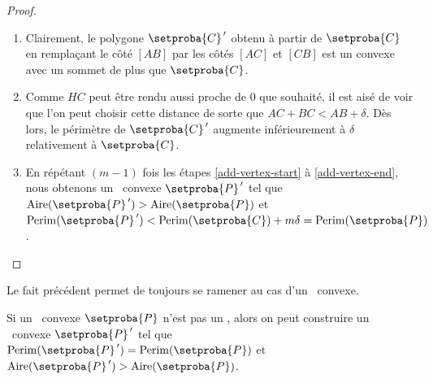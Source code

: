 \begin{proof}
\begin{enumerate}
		\item Clairement, le polygone $\setproba{C}^{\,\prime}$ obtenu à partir de $\setproba{C}$ en remplaçant le côté $[AB]$ par les côtés $[AC]$ et $[CB]$ est un convexe avec un sommet de plus que $\setproba{C}$.

		\item \label{add-vertex-end}
		Comme $HC$ peut être rendu aussi proche de $0$ que souhaité, il est aisé de voir que l'on peut choisir cette distance de sorte que $AC + BC < AB + \delta$.
		Dès lors, le périmètre de $\setproba{C}^{\,\prime}$ augmente inférieurement à $\delta$ relativement à $\setproba{C}$.

		\item En répétant $(m-1)$ fois les étapes \ref{add-vertex-start} à \ref{add-vertex-end}, nous obtenons un \ngone\ convexe $\setproba{P}^{\,\prime}$ tel que
		$\area{\setproba{P}^{\,\prime}} > \area{\setproba{P}}$
		et
		$\perim{\setproba{P}^{\,\prime}} < \perim{\setproba{C}} + m \delta = \perim{\setproba{P}}$.
	\end{enumerate}
\end{proof}


\begin{remark}
	Le fait précédent permet de toujours se ramener au cas d'un \ngone\ convexe.
\end{remark}




\begin{fact} \label{iso-poly}
	Si un \ngone\ convexe $\setproba{P}$ n'est pas un \nequi, alors on peut construire un \ngone\ convexe $\setproba{P}^{\,\prime}$ tel que
	$\perim{\setproba{P}^{\,\prime}} = \perim{\setproba{P}}$
	et
	$\area{\setproba{P}^{\,\prime}} > \area{\setproba{P}}$.
\end{fact}


